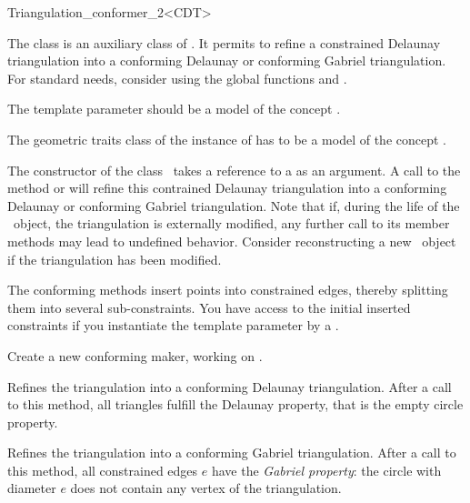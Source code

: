 \begin{ccRefClass}{Triangulation_conformer_2<CDT>}

The class \ccRefName{} is an auxiliary class of
. It permits to refine a constrained
Delaunay triangulation into a conforming Delaunay or conforming
Gabriel triangulation. For standard needs, consider using the global
functions  and
.

\ccParameters 

The template parameter  should be a model of the concept
.

The geometric traits class of the instance of  has to be
a model of the concept .


The constructor of the class \ccRefName\ takes a reference to a 
as an argument. A call to the method  or
 will refine this contrained Delaunay
triangulation into a conforming Delaunay or conforming Gabriel
triangulation. Note that if, during the life of the \ccRefName\ object, the
triangulation is externally modified, any further call to its member
methods may lead to undefined behavior. Consider reconstructing a new
\ccRefName\ object if the triangulation has been modified.

The conforming methods insert points into constrained edges, thereby splitting
them into several sub-constraints. You have access to the initial inserted
constraints if you instantiate the template parameter by a
.


\ccCreation
{}

{Create a new conforming maker, working on .}

\ccOperations


{ Refines the triangulation into a conforming Delaunay triangulation.
  After a call to this method, all triangles fulfill the Delaunay property,
  that is the empty circle
  property. }

{ Refines the triangulation into a conforming Gabriel triangulation.
  After a call to this method, all constrained edges $e$ have the
  \emph{Gabriel property}: the circle with diameter $e$ 
  does not contain any vertex of the triangulation. }


\end{ccRefClass}
